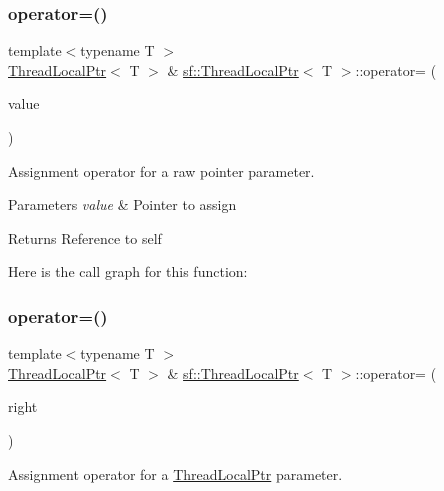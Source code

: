 \subsubsection{\texorpdfstring{operator=()}{operator=()}\hspace{0.1cm}{\footnotesize\ttfamily [1/2]}}
{\footnotesize\ttfamily template$<$typename T $>$ \\
\hyperlink{classsf_1_1_thread_local_ptr}{Thread\+Local\+Ptr}$<$ T $>$ \& \hyperlink{classsf_1_1_thread_local_ptr}{sf\+::\+Thread\+Local\+Ptr}$<$ T $>$\+::operator= (\begin{DoxyParamCaption}\item[{T $\ast$}]{value }\end{DoxyParamCaption})}



Assignment operator for a raw pointer parameter. 


\begin{DoxyParams}{Parameters}
{\em value} & Pointer to assign\\
\hline
\end{DoxyParams}
\begin{DoxyReturn}{Returns}
Reference to self 
\end{DoxyReturn}
Here is the call graph for this function\+:
\mbox{\label{classsf_1_1_thread_local_ptr_a6792a6a808af06f0d13e3ceecf2fc947}} 
\subsubsection{\texorpdfstring{operator=()}{operator=()}\hspace{0.1cm}{\footnotesize\ttfamily [2/2]}}
{\footnotesize\ttfamily template$<$typename T $>$ \\
\hyperlink{classsf_1_1_thread_local_ptr}{Thread\+Local\+Ptr}$<$ T $>$ \& \hyperlink{classsf_1_1_thread_local_ptr}{sf\+::\+Thread\+Local\+Ptr}$<$ T $>$\+::operator= (\begin{DoxyParamCaption}\item[{const \hyperlink{classsf_1_1_thread_local_ptr}{Thread\+Local\+Ptr}$<$ T $>$ \&}]{right }\end{DoxyParamCaption})}



Assignment operator for a \hyperlink{classsf_1_1_thread_local_ptr}{Thread\+Local\+Ptr} parameter. 


